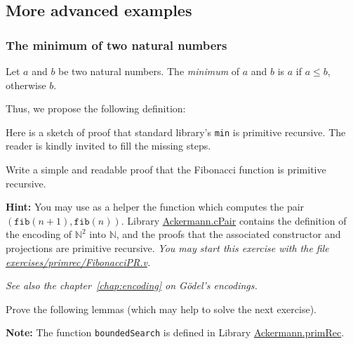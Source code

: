 \subsection{More advanced examples}



\subsubsection{The minimum of two natural numbers}

Let $a$ and $b$ be two natural numbers. The \emph{minimum} of $a$ and $b$ is $a$ if $a \leq b$, otherwise $b$.

Thus, we propose the following definition:


Here is a sketch of proof that standard library's \texttt{min} is
primitive recursive. The reader is kindly invited to fill the missing steps.





\begin{exercise}
Write a simple and readable proof that the Fibonacci function is primitive recursive.




\textbf{Hint:}  You may use as a helper the function which computes the pair \linebreak
$(\texttt{fib}(n+1),\texttt{fib}(n))$. 
Library \href{../theories/html/hydras.Ackermann.cPair.html}{Ackermann.cPair} contains
the definition of the encoding of $\mathbb{N}^2$ into $\mathbb{N}$, and the proofs that 
the associated constructor and projections are primitive recursive.  
\emph{You may start this exercise with the file
  \href{https://github.com/coq-community/hydra-battles/blob/master/exercises/primrec/FibonacciPR.v}{exercises/primrec/FibonacciPR.v}.}

\vspace{4pt}

\emph{See also the chapter~\ref{chap:encoding} on G\"{o}del's encodings.}

\end{exercise}

\begin{exercise}

Prove the following lemmas (which may help to solve the next  exercise).


\textbf{Note:}  The function \texttt{boundedSearch} is defined
in Library \href{../theories/html/hydras.Ackermann.primRec.html}{Ackermann.primRec}. 
\end{exercise}

